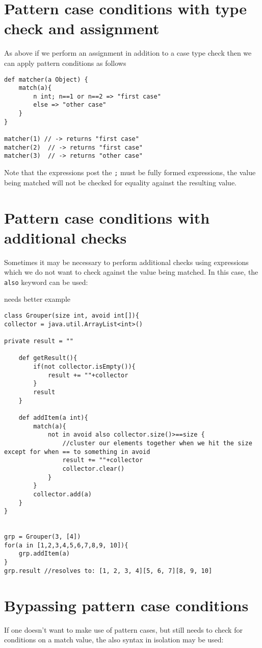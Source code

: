 \documentclass[conc-doc]{subfiles}
\begin{document}
\section{Pattern case conditions with type check and assignment}
As above if we perform an assignment in addition to a case type check then we can apply pattern conditions as follows

\begin{lstlisting}
def matcher(a Object) {
	match(a){
		n int; n==1 or n==2 => "first case"
		else => "other case"
	}
}

matcher(1) // -> returns "first case"
matcher(2)  // -> returns "first case"
matcher(3)  // -> returns "other case"
\end{lstlisting}

Note that the expressions post the \lstinline{;} must be fully formed expressions, the value being matched will not be checked for equality against the resulting value.

\section{Pattern case conditions with additional checks}
Sometimes it may be necessary to perform additional checks using expressions which we do not want to check against the value being matched. In this case, the \lstinline{also} keyword can be used:

 needs better example

\begin{lstlisting}
class Grouper(size int, avoid int[]){
collector = java.util.ArrayList<int>()

private result = ""

	def getResult(){
		if(not collector.isEmpty()){
			result += ""+collector 
		}
		result
	}

	def addItem(a int){
		match(a){
			not in avoid also collector.size()>==size {
				//cluster our elements together when we hit the size except for when == to something in avoid
				result += ""+collector
				collector.clear()
			}
		}
		collector.add(a)
	}
}


grp = Grouper(3, [4])
for(a in [1,2,3,4,5,6,7,8,9, 10]){
	grp.addItem(a)
}
grp.result //resolves to: [1, 2, 3, 4][5, 6, 7][8, 9, 10]
\end{lstlisting}

\section{Bypassing pattern case conditions}
If one doesn't want to make use of pattern cases, but still needs to check for conditions on a match value, the also syntax in isolation may be used:
\end{document}
